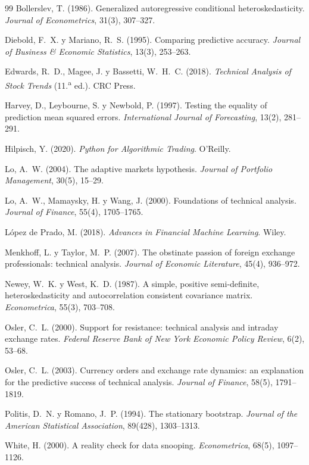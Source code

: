 \documentclass[10pt,a4paper]{article}
\begin{document}
\begin{thebibliography}{99}\small
{}
Bollerslev, T. (1986). Generalized autoregressive conditional heteroskedasticity.
\textit{Journal of Econometrics}, 31(3), 307--327.

Diebold, F.~X. y Mariano, R.~S. (1995). Comparing predictive accuracy.
\textit{Journal of Business \& Economic Statistics}, 13(3), 253--263.

Edwards, R.~D., Magee, J. y Bassetti, W.~H.~C. (2018). \textit{Technical Analysis
of Stock Trends} (11.\textsuperscript{a} ed.). CRC Press.

Harvey, D., Leybourne, S. y Newbold, P. (1997). Testing the equality of prediction
mean squared errors. \textit{International Journal of Forecasting}, 13(2), 281--291.

Hilpisch, Y. (2020). \textit{Python for Algorithmic Trading}. O'Reilly.

Lo, A.~W. (2004). The adaptive markets hypothesis. \textit{Journal of Portfolio
Management}, 30(5), 15--29.

Lo, A.~W., Mamaysky, H. y Wang, J. (2000). Foundations of technical analysis.
\textit{Journal of Finance}, 55(4), 1705--1765.

López de Prado, M. (2018). \textit{Advances in Financial Machine Learning}. Wiley.

Menkhoff, L. y Taylor, M.~P. (2007). The obstinate passion of foreign exchange
professionals: technical analysis. \textit{Journal of Economic Literature}, 45(4),
936--972.

Newey, W.~K. y West, K.~D. (1987). A simple, positive semi-definite,
heteroskedasticity and autocorrelation consistent covariance matrix.
\textit{Econometrica}, 55(3), 703--708.

Osler, C.~L. (2000). Support for resistance: technical analysis and intraday
exchange rates. \textit{Federal Reserve Bank of New York Economic Policy Review},
6(2), 53--68.

Osler, C.~L. (2003). Currency orders and exchange rate dynamics: an explanation
for the predictive success of technical analysis. \textit{Journal of Finance},
58(5), 1791--1819.

Politis, D.~N. y Romano, J.~P. (1994). The stationary bootstrap. \textit{Journal
of the American Statistical Association}, 89(428), 1303--1313.

White, H. (2000). A reality check for data snooping. \textit{Econometrica}, 68(5),
1097--1126.
\end{thebibliography}
\end{document}
